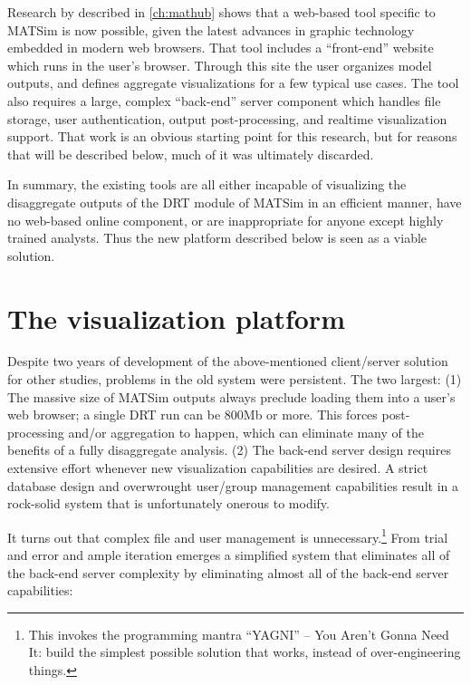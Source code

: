 Research by \citet{CharltonLaudan2020WebBasedVisualization} described in \autoref{ch:mathub} shows that a web-based tool specific to MATSim is now possible, given the latest advances in graphic technology embedded in modern web browsers. That tool includes a ``front-end'' website which runs in the user's browser. Through this site the user organizes model outputs, and defines aggregate visualizations for a few typical use cases. The tool also requires a large, complex ``back-end'' server component which handles file storage, user authentication, output post-processing, and realtime visualization support. That work is an obvious starting point for this research, but for reasons that will be described below, much of it was ultimately discarded.

In summary, the existing tools are all either incapable of visualizing the disaggregate outputs of the DRT module of MATSim in an efficient manner, have no web-based online component, or are inappropriate for anyone except highly trained analysts. Thus the new platform described below is seen as a viable solution.

\section{The visualization platform}
\label{avov-platform}

Despite two years of development of the above-mentioned client/server solution for other studies, problems in the old system were persistent. The two largest: (1) The massive size of MATSim outputs always preclude loading them into a user's web browser; a single DRT run can be 800Mb or more. This forces post-processing and/or aggregation to happen, which can eliminate many of the benefits of a fully disaggregate analysis. (2) The back-end server design requires extensive effort whenever new visualization capabilities are desired. A strict database design and overwrought user/group management capabilities result in a rock-solid system that is unfortunately onerous to modify.

It turns out that complex file and user management is unnecessary.\footnote{This invokes the programming mantra ``YAGNI'' -- You Aren't Gonna Need It: build the simplest possible solution that works, instead of over-engineering things.} From trial and error and ample iteration emerges a simplified system that eliminates all of the back-end server complexity by eliminating almost all of the back-end server capabilities:

